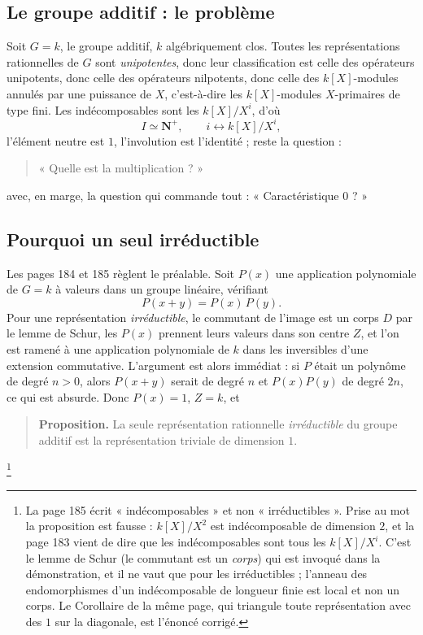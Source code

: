 \documentclass[11pt,a4paper]{article}
\begin{document}
\subsection*{Le groupe additif : le problème}

Soit $G = k$, le groupe additif, $k$ algébriquement clos. Toutes les
représentations rationnelles de $G$ sont \emph{unipotentes}, donc leur
classification est celle des opérateurs unipotents, donc celle des opérateurs
nilpotents, donc celle des $k[X]$-modules annulés par une puissance de $X$,
c'est-à-dire les $k[X]$-modules $X$-primaires de type fini. Les indécomposables sont les
$k[X]/X^{i}$, d'où
\[
I \simeq \mathbf{N}^{+} , \qquad i \leftrightarrow k[X]/X^{i} ,
\]
l'élément neutre est $1$, l'involution est l'identité ; reste la question :
\begin{quote}
« Quelle est la multiplication ? »
\end{quote}
avec, en marge, la question qui commande tout : « Caractéristique $0$ ? »

\subsection*{Pourquoi un seul irréductible}

Les pages 184 et 185 règlent le préalable. Soit $P(x)$ une application
polynomiale de $G = k$ à valeurs dans un groupe linéaire, vérifiant
\[
P(x+y) = P(x)\,P(y) .
\]
Pour une représentation \emph{irréductible}, le commutant de l'image est un
corps $D$ par le lemme de Schur, les $P(x)$ prennent leurs valeurs dans son
centre $Z$, et l'on est ramené à une application polynomiale de $k$ dans les
inversibles d'une extension commutative. L'argument est alors immédiat : si $P$
était un polynôme de degré $n > 0$, alors $P(x+y)$ serait de degré $n$ et
$P(x)P(y)$ de degré $2n$, ce qui est absurde. Donc $P(x) = 1$, $Z = k$, et
\begin{quote}
\textbf{Proposition.} La seule représentation rationnelle \emph{irréductible}
du groupe additif est la représentation triviale de dimension $1$.
\end{quote}
\footnote{La page 185 écrit « indécomposables » et non « irréductibles ». Prise
au mot la proposition est fausse : $k[X]/X^{2}$ est indécomposable de dimension
$2$, et la page 183 vient de dire que les indécomposables sont tous
les $k[X]/X^{i}$. C'est le lemme de Schur (le commutant est un \emph{corps})
qui est invoqué dans la démonstration, et il ne vaut que pour les
irréductibles ; l'anneau des endomorphismes d'un indécomposable de longueur
finie est local et non un corps. Le Corollaire de la même page, qui triangule
toute représentation avec des $1$ sur la diagonale, est l'énoncé
corrigé.}
\end{document}
